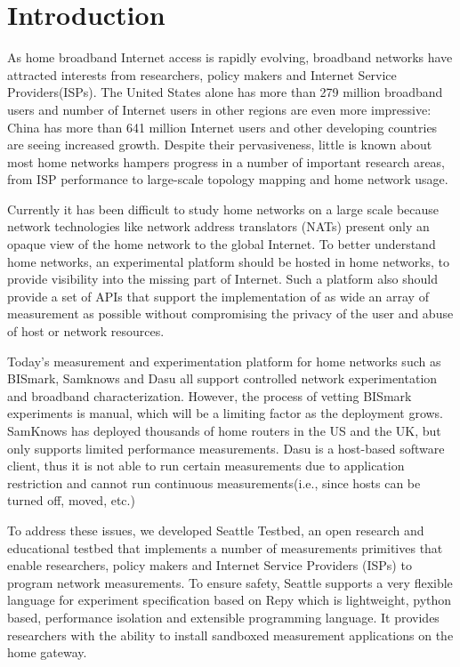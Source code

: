 \section{Introduction}
\label{sec.introduction}
As home broadband Internet access is rapidly evolving, broadband networks 
have attracted interests from researchers, policy makers and Internet 
Service Providers(ISPs). The United States alone has more than 279 million 
broadband users and number of Internet users in other regions are even more 
impressive: China has more than 641 million Internet users and other 
developing countries are seeing increased growth. Despite their 
pervasiveness, little is known about most home networks hampers progress in 
a number of important research areas, from ISP performance to large-scale 
topology mapping and home network usage.

Currently it has been difficult to study home networks on a large scale 
because network technologies like network address translators (NATs) present 
only an opaque view of the home network to the global Internet. To better 
understand home networks, an experimental platform should be hosted in home 
networks, to provide visibility into the missing part of Internet. Such a 
platform also should provide a set of APIs that support the implementation 
of as wide an array of measurement as possible without compromising the 
privacy of the user and abuse of host or network resources. 

Today's measurement and experimentation platform for home networks such as 
BISmark, Samknows and Dasu all support controlled network experimentation 
and broadband characterization. However, the process of vetting BISmark 
experiments is manual, which will be a limiting factor as the deployment 
grows. SamKnows has deployed thousands of home routers in the US and the UK, 
but only supports limited performance measurements. Dasu is a host-based 
software client, thus it is not able to run certain measurements due to 
application restriction and cannot run continuous measurements(i.e., since 
hosts can be turned off, moved, etc.)
 
To address these issues, we developed Seattle Testbed, an open research and 
educational testbed that implements a number of measurements primitives that 
enable researchers, policy makers and Internet Service Providers (ISPs) to 
program network measurements. To ensure safety, Seattle supports a very 
flexible language for experiment specification based on Repy which is 
lightweight, python based, performance isolation and extensible programming 
language. It provides researchers with the ability to install sandboxed 
measurement applications on the home gateway. 

